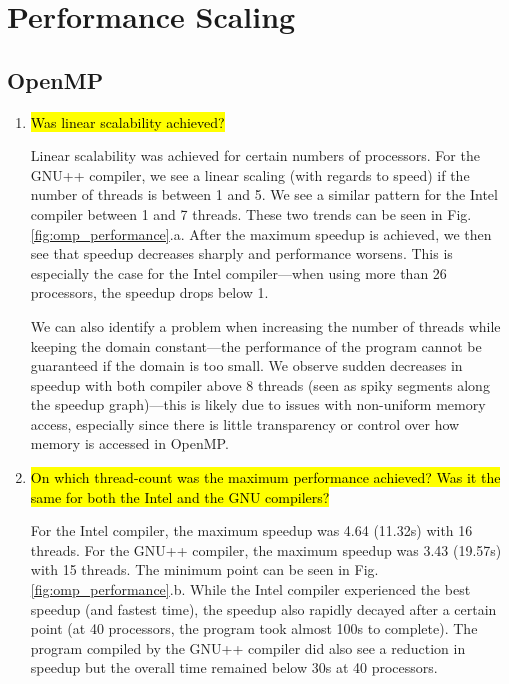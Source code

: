 \documentclass{article}
\begin{document}
\section{Performance Scaling}
\subsection{OpenMP}
\begin{enumerate}
	\item \hl{Was linear scalability achieved?}

	Linear scalability was achieved for certain numbers of processors. For the GNU++ compiler, we see a linear scaling (with regards to speed) if the number of threads is between 1 and 5. We see a similar pattern for the Intel compiler between 1 and 7 threads. These two trends can be seen in Fig.\ref{fig:omp_performance}.a. After the maximum speedup is achieved, we then see that speedup decreases sharply and performance worsens. This is especially the case for the Intel compiler---when using more than 26 processors, the speedup drops below 1.

	We can also identify a problem when increasing the number of threads while keeping the domain constant---the performance of the program cannot be guaranteed if the domain is too small. We observe sudden decreases in speedup with both compiler above 8 threads (seen as spiky segments along the speedup graph)---this is likely due to issues with non-uniform memory access, especially since there is little transparency or control over how memory is accessed in OpenMP.
	\vspace{1mm}

	\item \hl{On which thread-count was the maximum performance achieved? Was it the same for both the Intel and the GNU compilers?}

	For the Intel compiler, the maximum speedup was 4.64 (11.32s) with 16 threads. For the GNU++ compiler, the maximum speedup was 3.43 (19.57s) with 15 threads. The minimum point can be seen in Fig.\ref{fig:omp_performance}.b. While the Intel compiler experienced the best speedup (and fastest time), the speedup also rapidly decayed after a certain point (at 40 processors, the program took almost 100s to complete). The program compiled by the GNU++ compiler did also see a reduction in speedup but the overall time remained below 30s at 40 processors.


\end{enumerate}
\end{document}
